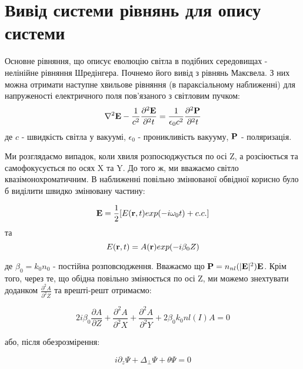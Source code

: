 \newpage

\section{Вивід системи рівнянь для опису системи}



\hspace*{8mm} Основне рівняння, що описує еволюцію світла в подібних середовищах - нелінійне рівняння Шредінгера. Почнемо його вивід з рівнянь Максвела. З них можна отримати наступне хвильове рівняння (в параксіальному наближенні) для напруженості електричного поля пов'язаного з світловим пучком:
\begin{equation}\label{eq:waveeq}
\nabla^2 {\bf E} - \dfrac{1}{c^2}\frac{\partial^2 {\bf E}}{\partial^2 t} = \dfrac{1}{\epsilon_0 c^2}\frac{\partial^2 {\bf P}}{\partial^2 t}
\end{equation}
де $c$ - швидкість світла у вакуумі, $\epsilon_0$ - проникливість вакууму, ${\bf P}$ - поляризація.

Ми розглядаємо випадок, коли хвиля розпосюджується по осі Z, а розсіюється та самофокусується по осях X та Y. До того ж, ми вважаємо світло квазімонохроматичним. В наближенні повільно змінюваної обвідної корисно було б виділити швидко змінювану частину:

\begin{equation}\label{eq:qseq}
{\bf E} = \dfrac{1}{2}[E({\bf r},t)exp(-i\omega_0 t) + c.c.]
\end{equation}
та\\

\begin{equation}\label{eq:qseq2}
E({\bf r},t) = A({\bf r})exp(-i\beta_0 Z)
\end{equation}

де $\beta_0 = k_0 n_0$ - постійна розповсюдження.
Вважаємо що ${\bf P} = n_{nl} (|{\bf E}|^2){\bf E}$. Крім того, через те, що обідна повільно змінюється по осі Z, ми можемо знехтувати доданком $\frac{\partial^2 A}{\partial^2 Z}$ та врешті-решт отримаємо:


\begin{equation}\label{eq:almNLS}
2i\beta_0 \frac{\partial A}{\partial Z} + \frac{\partial^2 A}{\partial^2 X} + \frac{\partial^2 A}{\partial^2 Y} + 2\beta_0 k_0 nl(I)A = 0
\end{equation}

або, після обезрозмірення:

\begin{equation}\label{eq:NLS1} 
i\partial_z \Psi+\Delta_\perp\Psi +\theta\Psi=0
\end{equation}

